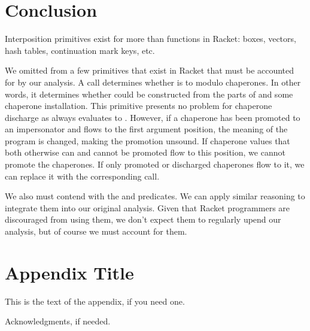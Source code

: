 \documentclass{sigplanconf}
\begin{document}
\section{Conclusion}

Interposition primitives exist for more than functions in Racket: boxes, vectors, hash tables, continuation mark keys, etc.

We omitted from \chapcalc a few primitives that exist in Racket that must be accounted for by our analysis.
A call  determines whether  is  to  modulo chaperones.
In other words, it determines whether  could be constructed from the parts of  and some chaperone installation.
This primitive presents no problem for chaperone discharge as  always evaluates to .
However, if a chaperone has been promoted to an impersonator and flows to the first argument position, the meaning of the program is changed, making the promotion unsound.
If chaperone values that both otherwise can and cannot be promoted flow to this position, we cannot promote the chaperones.
If only promoted or discharged chaperones flow to it, we can replace it with the corresponding  call.

We also must contend with the  and  predicates. We can apply similar reasoning to integrate them into our original analysis.
Given that Racket programmers are discouraged from using them, we don't expect them to regularly upend our analysis, but of course we must account for them.


\appendix
\section{Appendix Title}

This is the text of the appendix, if you need one.

\acks

Acknowledgments, if needed.









\end{document}

